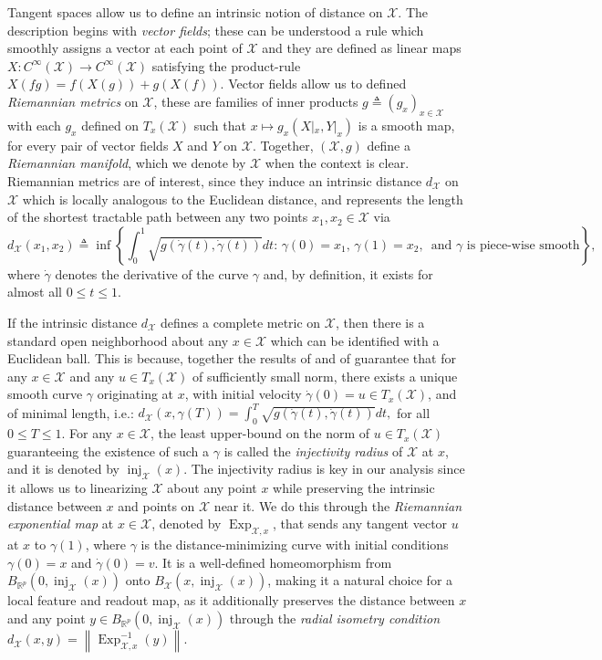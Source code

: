\documentclass[anon,12pt]{colt2021} %
\newcommand{\rr}{{\mathbb{R}}}
\newcommand{\rrflex}[1]{{\ensuremath{\rr^{#1}
}}}
\newcommand{\rrp}{{\rrflex{p}}}
\newcommand{\xxx}{\mathcal{X}}
\begin{document}
Tangent spaces allow us to define an intrinsic notion of distance on $\xxx$.  The description begins with \textit{vector fields}; these can be understood a rule which smoothly assigns a vector at each point of $\xxx$ and they are defined as linear maps $X:C^{\infty}(\xxx)\rightarrow C^{\infty}(\xxx)$ satisfying the product-rule $X(fg) = f(X(g)) + g(X(f))$.  Vector fields allow us to defined \textit{Riemannian metrics} on $\xxx$, these are families of inner products $g\triangleq (g_x)_{x \in \xxx}$ with each $g_x$ defined on $T_x(\xxx)$ such that $x\mapsto g_x(X|_x,Y|_x)$ is a smooth map, for every pair of vector fields $X$ and $Y$ on $\xxx$.  Together, $(\xxx,g)$ define a \textit{Riemannian manifold}, which we denote by $\xxx$ when the context is clear.  Riemannian metrics are of interest, since they induce an intrinsic distance $d_{\xxx}$ on $\xxx$ which is locally analogous to the Euclidean distance, and represents the length of the shortest tractable path between any two points $x_1,x_2 \in \xxx$ via
$$
d_{\xxx}(x_1,x_2)
\triangleq 
\inf \left\{
\int_0^1 
\sqrt{
g\left(
    \dot{\gamma}(t)
,
    \dot{\gamma}(t)
\right)
}
dt
:\,
\gamma(0)=x_1,\,\gamma(1)=x_2,\, \mbox{ and }
\gamma \mbox{ is piece-wise smooth}
\right\}
,
$$
where $\dot{\gamma}$ denotes the derivative of the curve $\gamma$ and, by definition, it exists for almost all $0\leq t\leq 1$.  

If the intrinsic distance $d_{\xxx}$ defines a complete metric on $\xxx$, then there is a standard open neighborhood about any $x \in \xxx$ which can be identified with a Euclidean ball.  This is because, together the results of \cite{Rinow1964} and of \cite{Lindelof_1894aa} guarantee that for any $x\in \xxx$ and any $u \in T_x(\xxx)$ of sufficiently small norm, there exists a unique smooth curve $\gamma$ originating at $x$, with initial velocity $\dot{\gamma}(0)=u\in T_{x}(\xxx)$, and of minimal length, i.e.:  $d_{\xxx}(x,\gamma(T))
    =
\int_0^T
\sqrt{
g\left(
    \dot{\gamma}(t)
,
    \dot{\gamma}(t)
\right)
}
dt
,
$ for all $0\leq T\leq 1$.  For any $x \in \xxx$, the least upper-bound on the norm of $u \in T_{x}(\xxx)$ guaranteeing the existence of such a $\gamma$ is called the \textit{injectivity radius} of $\xxx$ at $x$, and it is denoted by $\operatorname{inj}_{\xxx}(x)$.  The injectivity radius is key in our analysis since it allows us to linearizing $\xxx$ about any point $x$ while preserving the intrinsic distance between $x$ and points on $\xxx$ near it.  We do this through the \textit{Riemannian exponential map} at $x \in \xxx$, denoted by $\operatorname{Exp}_{\xxx,x}$, that sends any tangent vector $u$ at $x$ to $\gamma(1)$, where $\gamma$ is the distance-minimizing curve with initial conditions $\gamma(0)=x$ and $\dot{\gamma}(0)=v$.  It is a well-defined homeomorphism from $B_{\rrp}(0,\operatorname{inj}_{\xxx}(x))$ onto $B_{\xxx}(x,\operatorname{inj}_{\xxx}(x))$, making it a natural choice for a local feature and readout map, as it additionally preserves the distance between $x$ and any point $y \in B_{\rrp}(0,\operatorname{inj}_{\xxx}(x))$ through the \textit{radial isometry condition}
$
d_{\xxx}(x,y) = \left\|
\operatorname{Exp}_{\xxx,x}^{-1}(y)
\right\|
.
$
\end{document}
